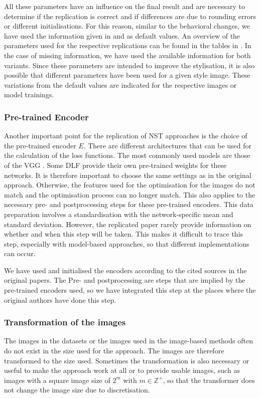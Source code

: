 All these parameters have an influence on the final result and are necessary to determine if the replication is correct and if differences are due to rounding errors or different initialisations. For this reason, similar to the behavioral changes, we have used the information given in \paper{} and \implementation{} as default values. An overview of the parameters used for the respective replications can be found in the tables in . In the case of missing information, we have used the available information for both variants. Since these parameters are intended to improve the stylisation, it is also possible that different parameters have been used for a given style image. These variations from the default values are indicated for the respective images or model trainings.

\subsubsection{Pre-trained Encoder}
Another important point for the replication of \gls{NST} approaches is the choice of the pre-trained encoder $E$. There are different architectures that can be used for the calculation of the loss functions. The most commonly used models are those of the \gls{VGG} \cite{SZ2015}. Some \gls{DLF} provide their own pre-trained weights for these networks. It is therefore important to choose the same settings as in the original approach. Otherwise, the features used for the optimisation for the images do not match and the optimisation process can no longer match. This also applies to the necessary pre- and postprocessing steps for these pre-trained encoders. This data preparation involves a standardisation with the network-specific mean and standard deviation. However, the replicated paper rarely provide information on whether and when this step will be taken. This makes it difficult to trace this step, especially with model-based approaches, so that different implementations can occur.  

We have used and initialised the encoders according to the cited sources in the original papers. The Pre- and postprocessing are steps that are implied by the pre-trained encoders used, so we have integrated this step at the places where the original authors have done this step.

\subsubsection{Transformation of the images}
The images in the datasets or the images used in the image-based methods often do not exist in the size used for the approach. The images are therefore transformed to the size used. Sometimes the transformation is also necessary or useful to make the approach work at all or to provide usable images, such as images with a square image size of $2^{m}$ with $ m \in \mathbb{Z}^{+}$, so that the transformer does not change the image size due to discretisation. 

